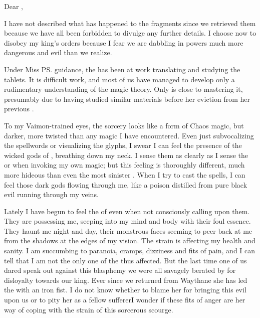 \begin{diary}%
  Dear \Ambrose{} \Onatol, 

  I have not described what has happened to the \EreshKali{} fragments since we retrieved them because we have all been forbidden to divulge any further details. 
  I choose now to disobey my king's orders because I fear we are dabbling in powers much more dangerous and evil than we realize. 

  Under Miss \ps{\Takestsha}{} guidance, the \ishrah{} has been at work translating and studying the tablets. 
  It is difficult work, and most of us have managed to develop only a rudimentary understanding of the \EreshKali{} magic theory. 
  Only \Takestsha{} is close to mastering it, presumably due to having studied similar materials before her eviction from her previous \ishrah. 

  To my Vaimon-trained eyes, the \EreshKali{} sorcery looks like a form of Chaos magic, but darker, more twisted than any \Rethyactic{} magic I have encountered. 
  Even just subvocalizing the spellwords or visualizing the glyphs, I swear I can feel the presence of the wicked gods of \EreshKal, breathing down my neck. 
  I sense them as clearly as I sense the \sephiroth{} or \qliphoth{} when invoking my own magic; but this feeling is thoroughly different, much more hideous than even the most sinister \qliphah. 
  When I try to cast the spells, I can feel those dark gods flowing through me, like a poison distilled from pure black evil running through my veins. 

  Lately I have begun to feel the \daemons{} of \EreshKal{} even when not consciously calling upon them. 
  They are possessing me, seeping into my mind and body with their foul essence. 
  They haunt me night and day, their monstrous faces seeming to peer back at me from the shadows at the edges of my vision. 
  The strain is affecting my health and sanity. 
  I am succumbing to paranoia, cramps, dizziness and fits of pain, and I can tell that I am not the only one of the \ishrah{} thus affected. 
  But the last time one of us dared speak out against this blasphemy we were all savagely berated by \Takestsha{} for disloyalty towards our king. 
  Ever since we returned from Waythane she has led the \ishrah{} with an iron fist. 
  I do not know whether to blame her for bringing this evil upon us or to pity her as a fellow sufferer\dash I wonder if these fits of anger are her way of coping with the strain of this sorcerous scourge. 


\end{diary}
